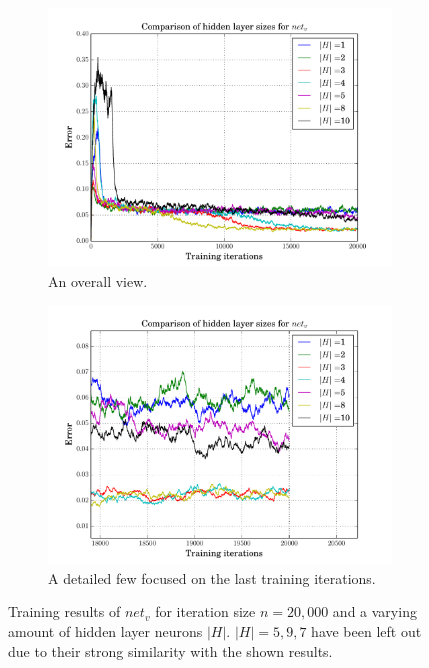 \documentclass[10pt,a4paper,DIV=11]{scrreprt}
\begin{document}
\begin{figure}[H]
\centering
\begin{subfigure}{\textwidth}
  \centering
  \includegraphics[width=0.8\linewidth]{files/supervised/hv.pdf}
  \caption{An overall view.}
  \label{fig:hvo}
\end{subfigure}%
\newline
\begin{subfigure}{\textwidth}
  \centering
  \includegraphics[width=0.8\linewidth]{files/supervised/hvend.pdf}
  \caption{A detailed few focused on the last training iterations.}
  \label{fig:hvend}
\end{subfigure}
\newline
\caption{Training results of $net_v$ for iteration size $n = 20,000$ and a 
         varying amount of hidden layer neurons $|H|$. $|H| = 5,9,7$ have 
         been left out due to their strong similarity with the shown results.}
\label{fig:hv}
\end{figure}
\end{document}
